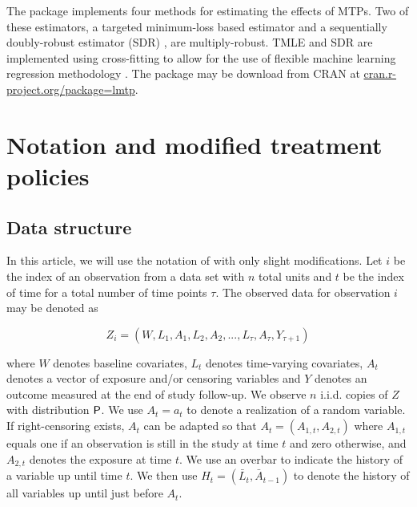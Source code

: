 \documentclass[]{jss}
\begin{document}
The package  implements four methods for estimating the
effects of MTPs. Two of these estimators, a targeted minimum-loss
based estimator \citep{laanTargetedLearningCausal2011a,
  laanTargetedMaximumLikelihood2006} and a sequentially doubly-robust
estimator (SDR) \citep{buckleyLinearRegressionCensored1979,
  fanCensoredRegressionLocal1994,
  vanderlaanUnifiedCrossValidationMethodology2003,
  rotnitzkyDoublyRobustEstimation2006, rubinDoublyRobustCensoring2006,
  kennedyNonparametricMethodsDoubly2017}, are multiply-robust. TMLE
and SDR are implemented using cross-fitting to allow for the use of
flexible machine learning regression methodology
\citep{diazNonparametricCausalEffects2020a}. The package may be
download from CRAN at \url{cran.r-project.org/package=lmtp}.

\hypertarget{notation-and-modified-treatment-policies}{%
\section{Notation and modified treatment
policies}\label{notation-and-modified-treatment-policies}}

\hypertarget{data-structure}{%
\subsection{Data structure}\label{data-structure}}

In this article, we will use the notation of
\citet{diazNonparametricCausalEffects2020a} with only slight
modifications.  Let \(i\) be the index of an observation from a data
set with \(n\) total units and \(t\) be the index of time for a total
number of time points \(\tau\).  The observed data for observation
\(i\) may be denoted as

\begin{equation}
Z_i = (W, L_1, A_1, L_2, A_2, ..., L_{\tau}, A_{\tau}, Y_{\tau + 1}) 
\end{equation}

where \(W\) denotes baseline covariates, \(L_t\) denotes time-varying
covariates, \(A_t\) denotes a vector of exposure and/or censoring variables and \(Y\)
denotes an outcome measured at the end of study follow-up. We observe \(n\)
i.i.d. copies of \(Z\) with distribution \(\mathsf{P}\). We use \(A_t = a_t\) to
denote a realization of a random variable. If right-censoring
exists, \(A_t\) can be adapted so that \(A_t = (A_{1, t}, A_{2, t})\)
where \(A_{1, t}\) equals one if an observation is still in the study at
time \(t\) and zero otherwise, and \(A_{2, t}\) denotes the exposure at
time \(t\). We use an overbar to indicate the history of a variable up
until time \(t\). We
then use \(H_t = (\bar{L}_t, \bar{A}_{t-1})\) to denote the history of
all variables up until just before \(A_t\).
\end{document}

